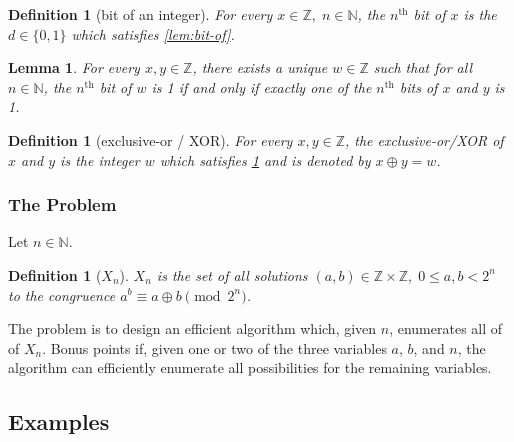 \documentclass[1gpt]{article}
\theoremstyle{break}
\newtheorem{lemma}[theorem]{Lemma}
\newtheorem{definition}[theorem]{Definition}
\newcommand{\xor}{\oplus}
\begin{document}
\begin{definition}[bit of an integer]
    \label{def:bit-of}
    For every $x \in \mathbb{Z},\; n \in \mathbb{N}$, the $n^\textrm{th}$ bit
    of $x$ is the $d \in \{ 0, 1 \}$ which satisfies \ref{lem:bit-of}.
\end{definition}

\begin{lemma}
    \label{lem:xor}
    For every $x, y \in \mathbb{Z}$, there exists a unique $w \in \mathbb{Z}$
    such that for all $n \in \mathbb{N}$, the $n^\textrm{th}$ bit of $w$ is 1
    if and only if exactly one of the $n^\textrm{th}$ bits of $x$ and $y$ is 1.
\end{lemma}

\begin{definition}[exclusive-or / XOR]
    \label{def:xor}
    For every $x, y \in \mathbb{Z}$, the exclusive-or/XOR of $x$ and $y$ is the
    integer $w$ which satisfies \ref{lem:xor} and is denoted by $x \xor y = w$.
\end{definition}

\subsubsection{The Problem}

Let $n \in \mathbb{N}$.

\begin{definition}[$X_n$]
    \label{def:xn}
    $X_n$ is the set of all solutions $(a, b) \in \mathbb{Z} \times
    \mathbb{Z},\; 0 \leq a,b < 2^n$ to the congruence $a^b \equiv a \xor b
    \pmod{2^n}$.
\end{definition}

The problem is to design an efficient algorithm which, given $n$, enumerates
all of of $X_n$. Bonus points if, given one or two of the three variables $a$,
$b$, and  $n$, the algorithm can efficiently enumerate all possibilities for
the remaining variables.

\subsection{Examples}
\end{document}
